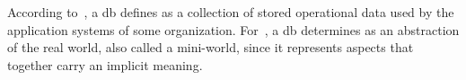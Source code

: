 According to~, a \ac{db} defines as a collection of stored operational data used by the application systems of some organization.
For~, a \ac{db} determines as an abstraction of the real world, also called a mini-world, since it represents aspects that together carry an implicit meaning.


